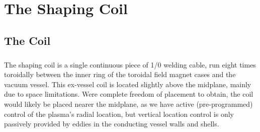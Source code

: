 \chapter{The Shaping Coil}
\section{The Coil}
\paragraph{} The shaping coil is a single continuous piece of 1/0 welding cable, run eight times toroidally between the inner ring of the toroidal field magnet cases and the vacuum vessel.  This ex-vessel coil is located slightly above the midplane, mainly due to space limitations.  Were complete freedom of placement to obtain, the coil would likely be placed nearer the midplane, as we have active (pre-programmed) control of the plasma's radial location, but vertical location control is only passively provided by eddies in the conducting vessel walls and shells.
